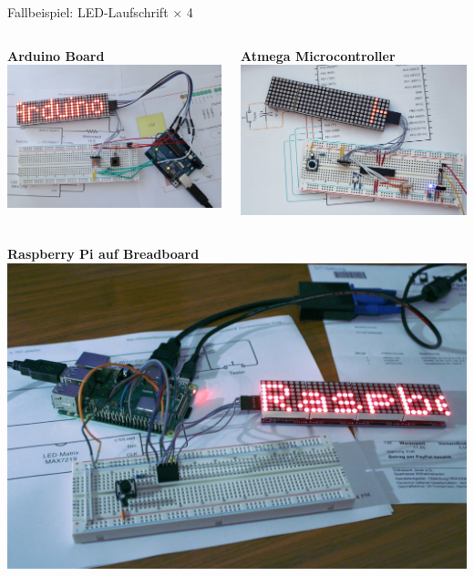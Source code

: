 {
\scriptsize

\begin{frame}{Fallbeispiel: LED-Laufschrift $\times$ 4}
    \begin{columns}
        \textbf{Arduino Board}
        \includegraphics[width=.9\textwidth]{img/laufschrift_arduino1}

        \textbf{Atmega Microcontroller}
        \includegraphics[width=.9\textwidth]{img/laufschrift_arduino2}
    \end{columns}

    \bigskip

    \begin{columns}
        \textbf{Raspberry Pi auf Breadboard}
        \includegraphics[width=.9\textwidth]{img/laufschrift_pi1}


\end{columns}
\end{frame}}
